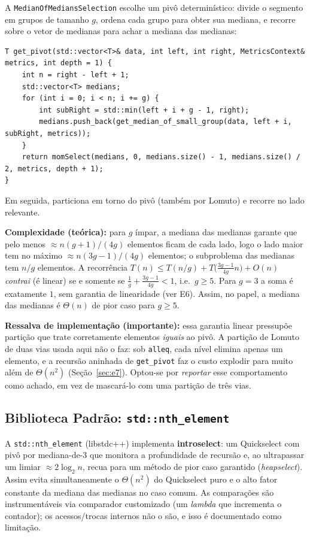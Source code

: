 \documentclass{infufrgs}
\begin{document}
A \texttt{MedianOfMediansSelection} escolhe um pivô determinístico: divide o segmento em grupos de tamanho $g$, ordena cada grupo para obter sua mediana, e recorre sobre o vetor de medianas para achar a mediana das medianas:

\begin{lstlisting}[caption={Seleção do pivô determinístico (MedianOfMedians.h)}]
T get_pivot(std::vector<T>& data, int left, int right, MetricsContext& metrics, int depth = 1) {
    int n = right - left + 1;
    std::vector<T> medians;
    for (int i = 0; i < n; i += g) {
        int subRight = std::min(left + i + g - 1, right);
        medians.push_back(get_median_of_small_group(data, left + i, subRight, metrics));
    }
    return momSelect(medians, 0, medians.size() - 1, medians.size() / 2, metrics, depth + 1);
}
\end{lstlisting}

Em seguida, particiona em torno do pivô (também por Lomuto) e recorre no lado relevante.

\textbf{Complexidade (teórica):} para $g$ ímpar, a mediana das medianas garante que pelo menos $\approx n(g+1)/(4g)$ elementos ficam de cada lado, logo o lado maior tem no máximo $\approx n(3g-1)/(4g)$ elementos; o subproblema das medianas tem $n/g$ elementos. A recorrência $T(n) \le T(n/g) + T\!\big(\tfrac{3g-1}{4g}n\big) + O(n)$ \emph{contrai} (é linear) se e somente se $\tfrac{1}{g} + \tfrac{3g-1}{4g} < 1$, i.e.\ $g \ge 5$. Para $g = 3$ a soma é exatamente $1$, sem garantia de linearidade (ver E6). Assim, no papel, a mediana das medianas é $\Theta(n)$ de pior caso para $g \ge 5$.

\textbf{Ressalva de implementação (importante):} essa garantia linear pressupõe partição que trate corretamente elementos \emph{iguais} ao pivô. A partição de Lomuto de duas vias usada aqui não o faz: sob \texttt{alleq}, cada nível elimina apenas um elemento, e a recursão aninhada de \texttt{get\_pivot} faz o custo explodir para muito além de $\Theta(n^2)$ (Seção~\ref{sec:e7}). Optou-se por \emph{reportar} esse comportamento como achado, em vez de mascará-lo com uma partição de três vias.

\subsection{Biblioteca Padrão: \texttt{std::nth\_element}}

A \texttt{std::nth\_element} (libstdc++) implementa \textbf{introselect}: um Quickselect com pivô por mediana-de-3 que monitora a profundidade de recursão e, ao ultrapassar um limiar $\approx 2\log_2 n$, recua para um método de pior caso garantido (\emph{heapselect}). Assim evita simultaneamente o $\Theta(n^2)$ do Quickselect puro e o alto fator constante da mediana das medianas no caso comum. As comparações são instrumentáveis via comparador customizado (um \emph{lambda} que incrementa o contador); os acessos/trocas internos não o são, e isso é documentado como limitação.
\end{document}
